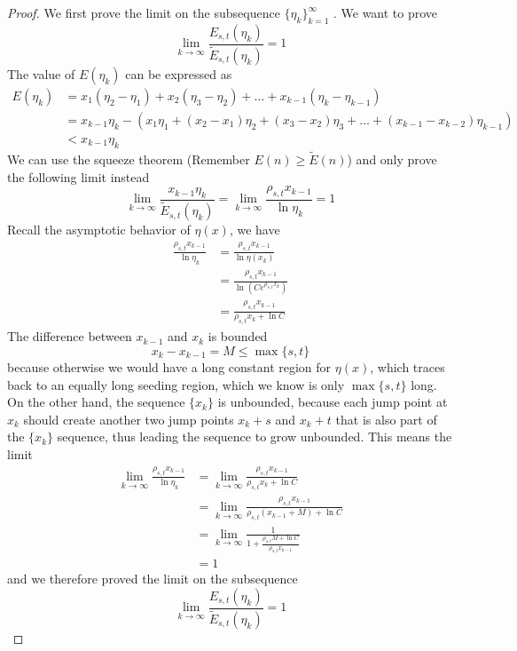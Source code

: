 \documentclass[]{article}
\begin{document}
\begin{proof}
	We first prove the limit on the subsequence $\{\eta_k\}_{k=1}^{\infty}$ . We want to prove 
	\[
	\lim_{k\to\infty}\frac{E_{s,t}(\eta_k)}{\tilde{E}_{s,t}(\eta_k)} = 1
	\]
	The value of $E(\eta_k)$ can be expressed as 
	\begin{align*}
	E(\eta_k) &= x_1 (\eta_2 - \eta_1) + x_2 (\eta_3 - \eta_2) + \dots +x_{k-1} (\eta_k - \eta_{k-1})\\
	&=  x_{k-1}\eta_k - (x_1 \eta_1 + (x_2 - x_1) \eta_2 + (x_3 - x_2)\eta_3 + \dots + (x_{k-1} - x_{k-2}) \eta_{k-1}) \\
	&< x_{k-1}\eta_k
	\end{align*}
	We can use the squeeze theorem (Remember $E(n) \ge \tilde{E}(n)$) and only prove the following limit instead
	\[
	\lim_{k\to\infty}\frac{x_{k-1}\eta_k}{\tilde{E}_{s,t}(\eta_k)} = \lim_{k\to\infty}\frac{\rho_{s,t}x_{k-1}}{\ln\eta_k} = 1
	\]
	Recall the asymptotic behavior of $\eta(x)$, we have
	\begin{align*}
	\frac{\rho_{s,t}x_{k-1}}{\ln\eta_k} &= \frac{\rho_{s,t}x_{k-1}}{\ln\eta(x_k)} \\
	&=\frac{\rho_{s,t}x_{k-1}}{\ln\left(C e^{\rho_{s,t}x_k}\right)}\\
	&=\frac {\rho_{s,t}x_{k-1}}{\rho_{s,t}x_k +\ln C }
	\end{align*}
	The difference between $x_{k-1}$ and $x_k$ is bounded
	\[
	x_k - x_{k-1} = M \le \max\{s, t\}
	\]	
	because otherwise we would have a long constant region for $\eta(x)$, which traces back to an equally long seeding region, which we know is only $\max\{s, t\}$ long. On the other hand, the sequence $\{x_k\}$ is unbounded, because each jump point at $x_k$ should create another two jump points $x_k+s$ and $x_k+t$ that is also part of the $\{x_k\}$ sequence, thus leading the sequence to grow unbounded. This means the limit 
	\begin{align*}
	\lim_{k\to\infty}\frac{\rho_{s,t}x_{k-1}}{\ln\eta_k} &= \lim_{k\to\infty}\frac {\rho_{s,t}x_{k-1}}{\rho_{s,t}x_k +\ln C } \\
	&= \lim_{k\to\infty}\frac {\rho_{s,t}x_{k-1}}{\rho_{s,t}(x_{k-1} + M) +\ln C }\\
	&= \lim_{k\to\infty}\frac {1}{1 + \frac{\rho_{s,t}M +\ln C}{\rho_{s,t}x_{k-1}} } \\
	&=1
	\end{align*}
	and we therefore proved the limit on the subsequence
	\[
	\lim_{k\to\infty}\frac{E_{s,t}(\eta_k)}{\tilde{E}_{s,t}(\eta_k)} = 1
	\]
	

\end{proof}
\end{document}
